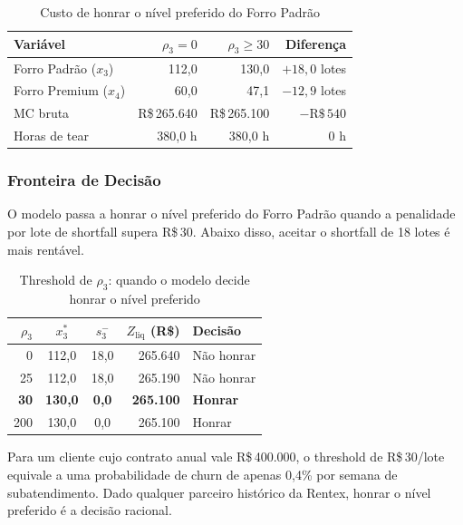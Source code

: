 \begin{table}[H]
\centering
\caption{Custo de honrar o nível preferido do Forro Padrão}
\label{tab:comparacao_pref}
\begin{tabular}{lrrr}
\toprule
\textbf{Variável} & \textbf{$\rho_3 = 0$} & \textbf{$\rho_3 \geq 30$} & \textbf{Diferença} \\
\midrule
Forro Padrão ($x_3$)  & 112,0 & 130,0 & $+18,0$ lotes \\
Forro Premium ($x_4$) &  60,0 &  47,1 & $-12,9$ lotes \\
MC bruta              & R\$\,265.640 & R\$\,265.100 & $-\text{R\$}\,540$ \\
Horas de tear         & 380,0 h & 380,0 h & 0 h \\
\bottomrule
\end{tabular}
\end{table}

\subsubsection{Fronteira de Decisão}

O modelo passa a honrar o nível preferido do Forro Padrão quando a penalidade
por lote de shortfall supera R\$\,30. Abaixo disso, aceitar o shortfall de 18
lotes é mais rentável.

\begin{table}[H]
\centering
\caption{Threshold de $\rho_3$: quando o modelo decide honrar o nível preferido}
\label{tab:frontier}
\begin{tabular}{rccrl}
\toprule
\textbf{$\rho_3$} & \textbf{$x_3^*$} & \textbf{$s_3^-$} & \textbf{$Z_{\text{liq}}$ (R\$)} & \textbf{Decisão} \\
\midrule
 0  & 112,0 & 18,0 & 265.640 & Não honrar \\
25  & 112,0 & 18,0 & 265.190 & Não honrar \\
\textbf{30} & \textbf{130,0} & \textbf{0,0} & \textbf{265.100} & \textbf{Honrar} \\
200 & 130,0 & 0,0 & 265.100 & Honrar \\
\bottomrule
\end{tabular}
\end{table}

Para um cliente cujo contrato anual vale R\$\,400.000, o threshold de
R\$\,30/lote equivale a uma probabilidade de churn de apenas 0,4\% por semana
de subatendimento. Dado qualquer parceiro histórico da Rentex, honrar o nível
preferido é a decisão racional.

